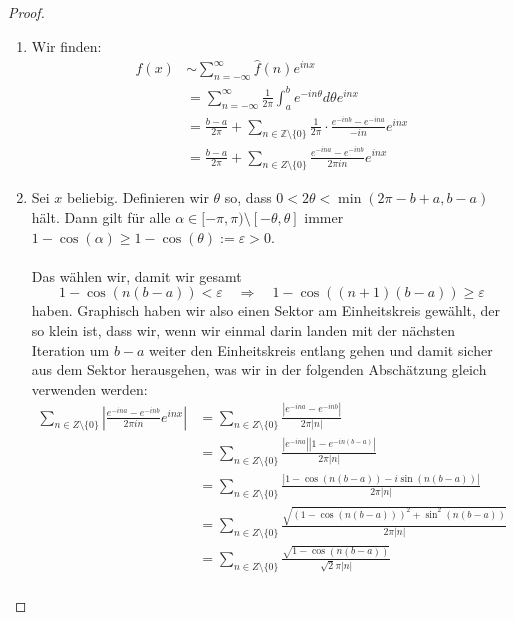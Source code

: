 \documentclass[11pt]{article}
\newcommand{\Z}{\mathbb{Z}}
\begin{document}
    \begin{proof}
        \begin{enumerate}[label = (\alph*)]
            \item Wir finden:
            $$\begin{aligned}
                  f(x)&\sim\sum_{n=-\infty}^{\infty}\hat{f}(n)e^{inx}\\
                  &= \sum_{n=-\infty}^{\infty}\frac{1}{2\pi}\int_a^b e^{-in\theta}d\theta e^{inx}\\
                  &= \frac{b-a}{2\pi}+\sum_{n\in\Z\setminus \{0\}}\frac{1}{2\pi}\cdot\frac{e^{-inb}-e^{-ina}}
                  {-in}e^{inx}\\&=
                  \frac{b-a}{2 \pi}+\sum_{n \in Z\setminus\{0\}} \frac{e^{-i n a}-e^{-i n b}}{2 \pi i n}e^{i n x}
            \end{aligned}$$
            \item Sei $x$ beliebig. Definieren wir $\theta$ so,
            dass $0<2\theta<\min(2\pi -b+a,b-a)$ hält. Dann gilt
            für alle $\alpha\in[-\pi,\pi)\setminus [-\theta,\theta]$ immer
            $1-\cos(\alpha)\geq 1-\cos(\theta):=\varepsilon>0$. \\\\
            Das wählen wir, damit wir gesamt
            $$1-\cos(n(b-a))<\varepsilon \quad \Rightarrow \quad 1-\cos((n+1)(b-a))\geq \varepsilon$$
            haben. Graphisch haben wir also einen Sektor am Einheitskreis gewählt, der so klein ist,
            dass wir, wenn wir einmal darin landen mit der nächsten Iteration um $b-a$ weiter
            den Einheitskreis entlang gehen und damit sicher aus dem Sektor herausgehen, was wir in
            der folgenden Abschätzung gleich verwenden werden:
            $$\begin{aligned}
                  \sum_{n \in Z\setminus\{0\}} \left|\frac{e^{-i n a}-e^{-i n b}}{2 \pi i n}e^{i n x}\right|&=
                  \sum_{n \in Z\setminus\{0\}} \frac{|e^{-i n a}-e^{-i n b}|}{2 \pi |n|}\\&=
                  \sum_{n \in Z\setminus\{0\}} \frac{|e^{-i n a}||1-e^{-i n (b-a)}|}{2 \pi |n|}\\&=
                  \sum_{n \in Z\setminus\{0\}} \frac{|1-\cos(n(b-a))-i\sin(n(b-a))|}{2 \pi |n|}\\&=
                  \sum_{n \in Z\setminus\{0\}} \frac{\sqrt{(1-\cos(n(b-a)))^2+\sin^2(n(b-a))}}{2 \pi |n|}\\&=
                  \sum_{n \in Z\setminus\{0\}} \frac{\sqrt{1-\cos(n(b-a))}}{\sqrt{2}\pi |n|}\\

\end{aligned}$$
\end{enumerate}
\end{proof}
\end{document}
